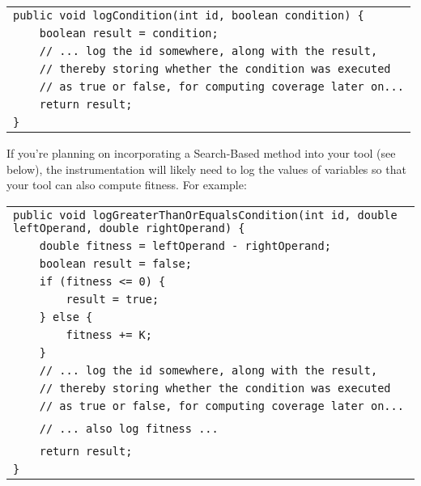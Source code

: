 \begin{center} 
    \scriptsize
    \begin{tabular}{l}
        \toprule
        \verb$public void logCondition(int id, boolean condition) {$\\
        \verb$    boolean result = condition;$\\
        \verb$    // ... log the id somewhere, along with the result, $\\
        \verb$    // thereby storing whether the condition was executed$\\
        \verb$    // as true or false, for computing coverage later on...$\\
        \verb$    return result;$\\
        \verb$}$\\
        \bottomrule
    \end{tabular}
\end{center}

If you're planning on incorporating a Search-Based method into your tool (see
below), the instrumentation will likely need to log the values of variables so
that your tool can also compute fitness. For example:

\begin{center} 
    \scriptsize
    \begin{tabular}{l}
        \toprule
        \verb$public void logGreaterThanOrEqualsCondition(int id, double leftOperand, double rightOperand) {$\\
        \verb$    double fitness = leftOperand - rightOperand;$\\
        \verb$    boolean result = false;$\\
        \verb$    if (fitness <= 0) {$\\
        \verb$        result = true;$\\
        \verb$    } else {$\\
        \verb$        fitness += K;$\\
        \verb$    }$\\
        \verb$    // ... log the id somewhere, along with the result,$\\
        \verb$    // thereby storing whether the condition was executed$\\
        \verb$    // as true or false, for computing coverage later on...$\\
        \verb$$\\
        \verb$    // ... also log fitness ...$\\
        \verb$$\\
        \verb$    return result;$\\
        \verb$}$\\
        \bottomrule
    \end{tabular}
\end{center}


